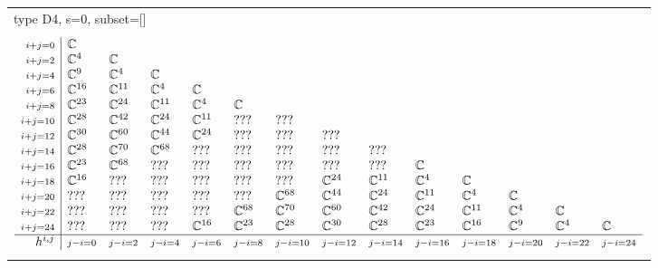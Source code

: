 \documentclass[crop,border=2mm]{standalone}
\begin{document}
\begin{tabular}{l}
{\huge type D4, s=0, subset=[]}\\ \\


$\displaystyle
\begin{array}{r|l l l l l l l l l l l l l}
	{\scriptstyle i+j=0}&\mathbb{C}&&&&&&&&&&&&\\
	{\scriptstyle i+j=2}&\mathbb{C}^{4}&\mathbb{C}&&&&&&&&&&&\\
	{\scriptstyle i+j=4}&\mathbb{C}^{9}&\mathbb{C}^{4}&\mathbb{C}&&&&&&&&&&\\
	{\scriptstyle i+j=6}&\mathbb{C}^{16}&\mathbb{C}^{11}&\mathbb{C}^{4}&\mathbb{C}&&&&&&&&&\\
	{\scriptstyle i+j=8}&\mathbb{C}^{23}&\mathbb{C}^{24}&\mathbb{C}^{11}&\mathbb{C}^{4}&\mathbb{C}&&&&&&&&\\
	{\scriptstyle i+j=10}&\mathbb{C}^{28}&\mathbb{C}^{42}&\mathbb{C}^{24}&\mathbb{C}^{11}&???&???&&&&&&&\\
	{\scriptstyle i+j=12}&\mathbb{C}^{30}&\mathbb{C}^{60}&\mathbb{C}^{44}&\mathbb{C}^{24}&???&???&???&&&&&&\\
	{\scriptstyle i+j=14}&\mathbb{C}^{28}&\mathbb{C}^{70}&\mathbb{C}^{68}&???&???&???&???&???&&&&&\\
	{\scriptstyle i+j=16}&\mathbb{C}^{23}&\mathbb{C}^{68}&???&???&???&???&???&???&\mathbb{C}&&&&\\
	{\scriptstyle i+j=18}&\mathbb{C}^{16}&???&???&???&???&???&\mathbb{C}^{24}&\mathbb{C}^{11}&\mathbb{C}^{4}&\mathbb{C}&&&\\
	{\scriptstyle i+j=20}&???&???&???&???&???&\mathbb{C}^{68}&\mathbb{C}^{44}&\mathbb{C}^{24}&\mathbb{C}^{11}&\mathbb{C}^{4}&\mathbb{C}&&\\
	{\scriptstyle i+j=22}&???&???&???&???&\mathbb{C}^{68}&\mathbb{C}^{70}&\mathbb{C}^{60}&\mathbb{C}^{42}&\mathbb{C}^{24}&\mathbb{C}^{11}&\mathbb{C}^{4}&\mathbb{C}&\\
	{\scriptstyle i+j=24}&???&???&???&\mathbb{C}^{16}&\mathbb{C}^{23}&\mathbb{C}^{28}&\mathbb{C}^{30}&\mathbb{C}^{28}&\mathbb{C}^{23}&\mathbb{C}^{16}&\mathbb{C}^{9}&\mathbb{C}^{4}&\mathbb{C}\\
	\hline h^{i,j}&{\scriptstyle j-i=0}&{\scriptstyle j-i=2}&{\scriptstyle j-i=4}&{\scriptstyle j-i=6}&{\scriptstyle j-i=8}&{\scriptstyle j-i=10}&{\scriptstyle j-i=12}&{\scriptstyle j-i=14}&{\scriptstyle j-i=16}&{\scriptstyle j-i=18}&{\scriptstyle j-i=20}&{\scriptstyle j-i=22}&{\scriptstyle j-i=24}
\end{array}
$ \\ \\



\end{tabular}
\end{document}
